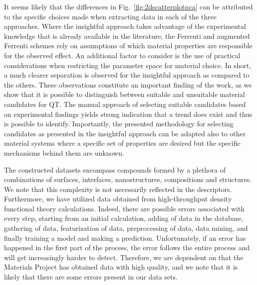 \documentclass[superscriptaddress,unsortedaddress,
 amsmath,amssymb,
 aps,
]{revtex4-2}
\newcommand{\marianne}[1]{\textcolor{blue}{#1}}
\begin{document}
It seems likely that the differences in Fig.~\ref{fig:2dscatterplotpca} can be attributed to the specific choices made when extracting data in each of the three approaches. Where the insightful approach takes advantage of the experimental knowledge that is already available in the literature, the Ferrenti and augmented Ferrenti schemes 
rely on assumptions of which material properties are responsible for the observed effect. 
An additional factor to consider is the use of practical considerations when restricting the parameter space for material choice. 
In short, a much clearer separation is observed for the insightful approach as compared to the others. 
These observations constitute an important finding of the work, as we show that it is possible to distinguish between suitable and unsuitable material candidates for QT. 
The manual approach of selecting suitable candidates based on experimental findings yields strong indication that a trend does exist and thus is possible to identify. 
Importantly, the presented methodology for selecting candidates as presented in the insightful approach can be adapted also to other material systems where a specific set of properties are desired but the specific mechanisms behind them are unknown. 


The constructed datasets encompass compounds formed by a plethora of combinations of surfaces, interfaces, nanostructures, compositions and structures. We note that this complexity is not necessarily reflected in the descriptors. 
Furthermore, we have utilized data obtained from high-throughput density functional theory calculations. Indeed, there are possible errors associated with every step, starting from an initial calculation, adding of data in the database, gathering of data, featurization of data, preprocessing of data, data mining, and finally training a model and making a prediction. Unfortunately, if an error has happened in the first part of the process, the error follows the entire process and will get increasingly harder to detect. Therefore, we are dependent on that the Materials Project has obtained data with high quality, and we note that it is likely that there are some errors present in our data sets.
\end{document}
